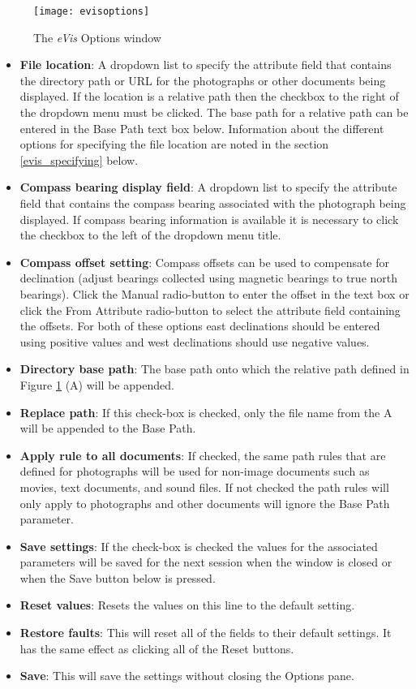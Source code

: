 \label{evis_options_window}

\begin{figure}[ht]
   \centering
   \texttt{[image: evisoptions]}
   \caption{The \emph{eVis} Options window \wincaption}\label{evisoptions}
\end{figure}

\begin{itemize}[label=--]
\item \textbf{File location}: A dropdown list to specify the attribute field that contains the
directory path or URL for the photographs or other documents being displayed. If the location is a
relative path then the checkbox to the right of the dropdown menu must be clicked. The base path for
a relative path can be entered in the Base Path text box below. Information about the different
options for specifying the file location are noted in the section \ref{evis_specifying} below.
\item \textbf{Compass bearing display field}: A dropdown list to specify the attribute field
that contains the compass bearing associated with the photograph being displayed. If compass bearing
information is available it is necessary to click the checkbox to the left of the dropdown menu
title.
\item \textbf{Compass offset setting}: Compass offsets can be used to compensate for
declination (adjust bearings collected using magnetic bearings to true north bearings). Click the
Manual radio-button to enter the offset in the text box or click the From Attribute  radio-button to
select the attribute field containing the offsets. For both of these options east declinations
should be entered using positive values and west declinations should use negative values.
\item \textbf{Directory base path}: The base path onto which the relative path defined in
Figure \ref{evisoptions} (A) will be appended.
\item \textbf{Replace path}: If this check-box is checked, only the file name from the A
will be appended to the Base Path.
\item \textbf{Apply rule to all documents}: If checked, the same path rules that are defined
for photographs will be used for non-image documents such as movies, text documents, and sound
files. If not checked the path rules will only apply to photographs and other documents will ignore
the Base Path  parameter.
\item \textbf{Save settings}: If the check-box is checked the values for the associated
parameters will be saved for the next session when the window is closed or when the Save button
below is pressed.
\item \textbf{Reset values}: Resets the values on this line to the default setting.
\item \textbf{Restore faults}: This will reset all of the fields to their default settings.
It has the same effect as clicking all of the Reset buttons.
\item \textbf{Save}: This will save the settings without closing the Options pane.
\end{itemize}

